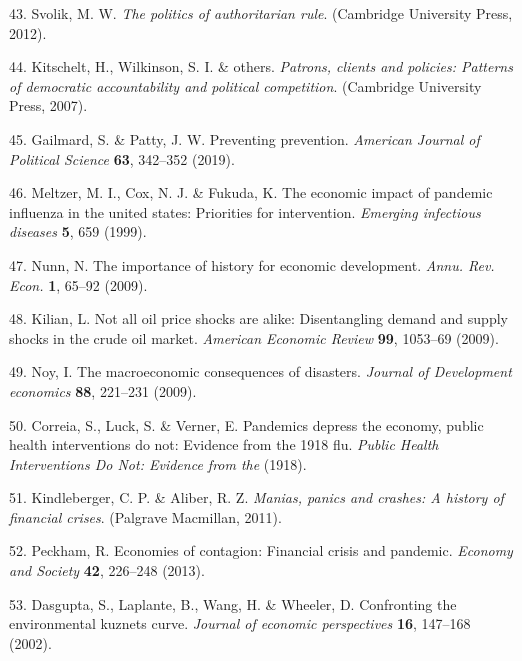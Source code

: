 \documentclass[
]{article}
\newenvironment{cslreferences}%
  {}%
  {\par}
\begin{document}
\begin{cslreferences}
\leavevmode\hypertarget{ref-svolik2012politics}{}%
43. Svolik, M. W. \emph{The politics of authoritarian rule}. (Cambridge University Press, 2012).

\leavevmode\hypertarget{ref-kitschelt2007patrons}{}%
44. Kitschelt, H., Wilkinson, S. I. \& others. \emph{Patrons, clients and policies: Patterns of democratic accountability and political competition}. (Cambridge University Press, 2007).

\leavevmode\hypertarget{ref-gailmard2019preventing}{}%
45. Gailmard, S. \& Patty, J. W. Preventing prevention. \emph{American Journal of Political Science} \textbf{63}, 342--352 (2019).

\leavevmode\hypertarget{ref-meltzer1999economic}{}%
46. Meltzer, M. I., Cox, N. J. \& Fukuda, K. The economic impact of pandemic influenza in the united states: Priorities for intervention. \emph{Emerging infectious diseases} \textbf{5}, 659 (1999).

\leavevmode\hypertarget{ref-nunn2009importance}{}%
47. Nunn, N. The importance of history for economic development. \emph{Annu. Rev. Econ.} \textbf{1}, 65--92 (2009).

\leavevmode\hypertarget{ref-kilian2009not}{}%
48. Kilian, L. Not all oil price shocks are alike: Disentangling demand and supply shocks in the crude oil market. \emph{American Economic Review} \textbf{99}, 1053--69 (2009).

\leavevmode\hypertarget{ref-noy2009macroeconomic}{}%
49. Noy, I. The macroeconomic consequences of disasters. \emph{Journal of Development economics} \textbf{88}, 221--231 (2009).

\leavevmode\hypertarget{ref-correia1918pandemics}{}%
50. Correia, S., Luck, S. \& Verner, E. Pandemics depress the economy, public health interventions do not: Evidence from the 1918 flu. \emph{Public Health Interventions Do Not: Evidence from the} (1918).

\leavevmode\hypertarget{ref-kindleberger2011manias}{}%
51. Kindleberger, C. P. \& Aliber, R. Z. \emph{Manias, panics and crashes: A history of financial crises}. (Palgrave Macmillan, 2011).

\leavevmode\hypertarget{ref-peckham2013economies}{}%
52. Peckham, R. Economies of contagion: Financial crisis and pandemic. \emph{Economy and Society} \textbf{42}, 226--248 (2013).

\leavevmode\hypertarget{ref-dasgupta2002confronting}{}%
53. Dasgupta, S., Laplante, B., Wang, H. \& Wheeler, D. Confronting the environmental kuznets curve. \emph{Journal of economic perspectives} \textbf{16}, 147--168 (2002).


\end{cslreferences}
\end{document}
